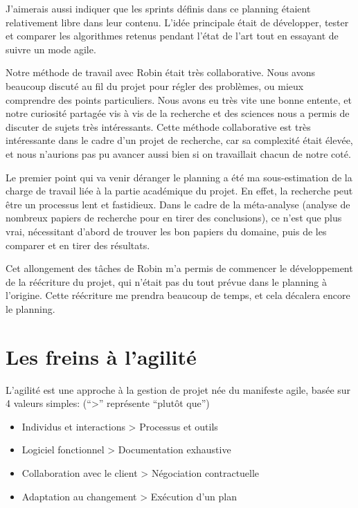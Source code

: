 \documentclass[openany, 11pt]{memoir}
\begin{document}
J'aimerais aussi indiquer que les sprints définis dans ce planning étaient relativement libre dans leur contenu. L'idée principale était de développer, tester et comparer les algorithmes retenus pendant l'état de l'art tout en essayant de suivre un mode agile.

\bigskip
Notre méthode de travail avec Robin était très collaborative. Nous avons beaucoup discuté au fil du projet pour régler des problèmes, ou mieux comprendre des points particuliers. Nous avons eu très vite une bonne entente, et notre curiosité partagée vis à vis de la recherche et des sciences nous a permis de discuter de sujets très intéressants. Cette méthode collaborative est très intéressante dans le cadre d'un projet de recherche, car sa complexité était élevée, et nous n'aurions pas pu avancer aussi bien si on travaillait chacun de notre coté.

\bigskip
Le premier point qui va venir déranger le planning a été ma sous-estimation de la charge de travail liée à la partie académique du projet. En effet, la recherche peut être un processus lent et fastidieux. Dans le cadre de la méta-analyse (analyse de nombreux papiers de recherche pour en tirer des conclusions), ce n'est que plus vrai, nécessitant d'abord de trouver les bon papiers du domaine, puis de les comparer et en tirer des résultats.

Cet allongement des tâches de Robin m'a permis de commencer le développement de la réécriture du projet, qui n'était pas du tout prévue dans le planning à l'origine. Cette réécriture me prendra beaucoup de temps, et cela décalera encore le planning.


\section{Les freins à l'agilité}

L'agilité est une approche à la gestion de projet née du manifeste agile, basée sur 4 valeurs simples: (``>'' représente ``plutôt que'')

\begin{itemize}
	\item Individus et interactions > Processus et outils
	\item Logiciel fonctionnel > Documentation exhaustive
	\item Collaboration avec le client > Négociation contractuelle
	\item Adaptation au changement > Exécution d'un plan
\end{itemize}
\end{document}

